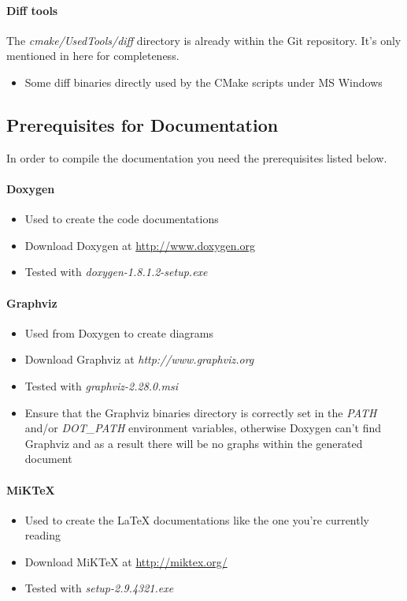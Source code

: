 \paragraph{Diff tools}
The \emph{cmake/UsedTools/diff} directory is already within the Git repository. It's only mentioned in here for completeness.
\begin{itemize}
\item{Some diff binaries directly used by the CMake scripts under \ac{MS} Windows}
\end{itemize}



\subsection{Prerequisites for Documentation}
In order to compile the documentation you need the prerequisites listed below.

\paragraph{Doxygen}
\begin{itemize}
\item{Used to create the code documentations}
\item{Download Doxygen at \url{http://www.doxygen.org}}
\item{Tested with \emph{doxygen-1.8.1.2-setup.exe}}
\end{itemize}


\paragraph{Graphviz}
\begin{itemize}
\item{Used from Doxygen to create diagrams}
\item{Download Graphviz at \emph{http://www.graphviz.org}}
\item{Tested with \emph{graphviz-2.28.0.msi}}
\item{Ensure that the Graphviz binaries directory is correctly set in the \emph{PATH} and/or \emph{DOT\_PATH} environment variables, otherwise Doxygen can't find Graphviz and as a result there will be no graphs within the generated document}
\end{itemize}


\paragraph{MiKTeX}
\begin{itemize}
\item{Used to create the \LaTeX{} documentations like the one you're currently reading}
\item{Download MiKTeX at \url{http://miktex.org/}}
\item{Tested with \emph{setup-2.9.4321.exe}}
\end{itemize}


